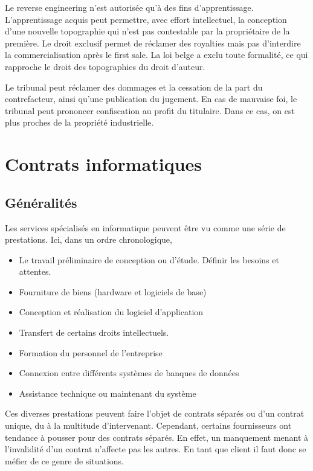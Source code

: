 \documentclass[fleqn,letterpaper, 12pt]{article}
\begin{document}
	Le reverse engineering n'est autorisée qu'à des fins d'apprentissage. L'apprentissage acquis peut permettre, avec effort intellectuel, la conception d'une nouvelle topographie qui n'est pas contestable par la propriétaire de la première. Le droit exclusif permet de réclamer des royalties mais pas d'interdire la commercialisation après le first sale. La loi belge a exclu toute formalité, ce qui rapproche le droit des topographies du droit d'auteur.
	
	Le tribunal peut réclamer des dommages et la cessation de la part du contrefacteur, ainsi qu'une publication du jugement. En cas de mauvaise foi, le tribunal peut prononcer confiscation au profit du titulaire. Dans ce cas, on est plus proches de la propriété industrielle.
	
	
	\section{Contrats informatiques}
	\subsection{Généralités}
	
	Les services spécialisés en informatique peuvent être vu comme une série de prestations. Ici, dans un ordre chronologique, 
	\begin{itemize}
		\item Le travail préliminaire de conception ou d'étude. Définir les besoins et attentes.
		\item Fourniture de biens (hardware et logiciels de base)
		\item Conception et réalisation du logiciel d'application
		\item Transfert de certains droits intellectuels.
		\item Formation du personnel de l'entreprise
		\item Connexion entre différents systèmes de banques de données
		\item Assistance technique ou maintenant du système
	\end{itemize}
	
	Ces diverses prestations peuvent faire l'objet de contrats séparés ou d'un contrat unique, du à la multitude d'intervenant. Cependant, certains fournisseurs ont tendance à pousser pour des contrats séparés. En effet, un manquement menant à l'invalidité d'un contrat n'affecte pas les autres. En tant que client il faut donc se méfier de ce genre de situations.
	
\end{document}
